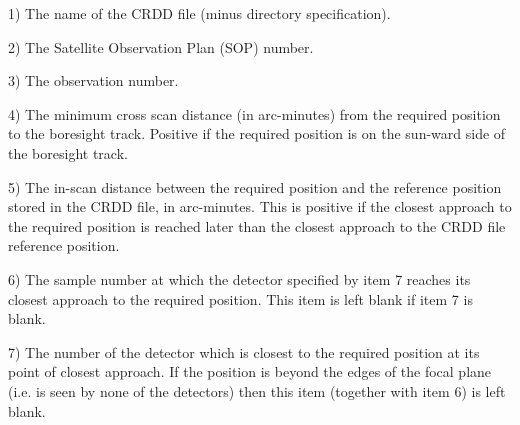 \documentclass[11pt,nolof,noabs]{starlink}
\begin{document}
\begin{small}
{{      1) The name of the CRDD file (minus directory specification).

      2) The Satellite Observation Plan (SOP) number.

      3) The observation number.

      4) The minimum cross scan distance (in arc-minutes) from the
      required position to the boresight track. Positive if the required
      position is on the sun-ward side of the boresight track.

      5) The in-scan distance between the required position and the
      reference position stored in the CRDD file, in arc-minutes. This
      is positive if the closest approach to the required position is
      reached later than the closest approach to the CRDD file
      reference position.

      6) The sample number at which the detector specified by item 7
      reaches its closest approach to the required position. This item
      is left blank if item 7 is blank.

      7) The number of the detector which is closest to the required
      position at its point of closest approach. If the position is
      beyond the edges of the focal plane (i.e. is seen by none of the
      detectors) then this item (together with item 6) is left blank.

}}
\end{small}
\end{document}
